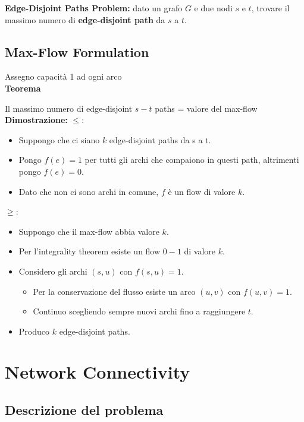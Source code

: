 \textbf{Edge-Disjoint Paths Problem:} dato un grafo $G$ e due nodi
$s$ e $t$, trovare il massimo numero di \textbf{edge-disjoint path}
da $s$ a $t$.


\subsection{Max-Flow Formulation}

Assegno capacità 1 ad ogni arco\\

\textbf{Teorema}

Il massimo numero di edge-disjoint $s-t$ paths = valore del max-flow\\

\textbf{Dimostrazione:} $\le:$
\begin{itemize}
    \item Suppongo che ci siano $k$ edge-disjoint paths da s a t.
    \item Pongo $f(e)=1$ per tutti gli archi che compaiono in questi path, altrimenti pongo $f(e)=0$.
    \item Dato che non ci sono archi in comune, $f$ è un flow di valore $k$.
\end{itemize}

$\ge:$
\begin{itemize}
    \item Suppongo che il max-flow abbia valore $k$.
    \item Per l'integrality theorem esiste un flow $0-1$ di valore $k$.
    \item Considero gli archi $(s, u)$ con $f(s, u) = 1$.
    \begin{itemize}
        \item Per la conservazione del flusso esiste un arco $(u,v)$ con $f(u, v) = 1$.
        \item Continuo scegliendo sempre nuovi archi fino a raggiungere $t$.
    \end{itemize}
    \item Produco $k$ edge-disjoint paths.
\end{itemize}

\section{Network Connectivity}

\subsection{Descrizione del problema}

